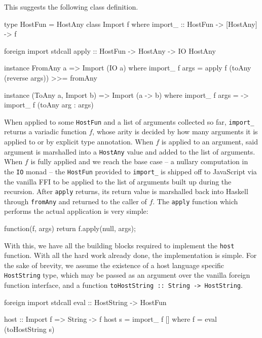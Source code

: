 \documentclass{sigplanconf}
\begin{document}
This suggests the following class definition.

\begin{code}
type HostFun = HostAny
class Import f where
  import_ :: HostFun -> [HostAny] -> f

foreign import stdcall
  apply :: HostFun -> HostAny -> IO HostAny

instance FromAny a => Import (IO a) where
  import_ f args =
    apply f (toAny (reverse args)) >>= fromAny

instance (ToAny a, Import b) =>
         Import (a -> b) where
  import_ f args =
    \arg -> import_ f (toAny arg : args)
\end{code}

When applied to some \lstinline!HostFun! and a list of arguments collected so
far, \lstinline!import_! returns a variadic function $f$, whose arity is decided
by how many arguments it is applied to or by explicit type annotation.
When $f$ is applied to an argument, said argument is marshalled into a
\lstinline!HostAny! value and added to the list of arguments.
When $f$ is fully applied and we reach the base case -- a nullary computation
in the \lstinline!IO! monad -- the \lstinline!HostFun! provided to
\lstinline!import_! is shipped off to JavaScript via the vanilla FFI to be
applied to the list of arguments built up during the recursion.
After \lstinline!apply! returns, its return value is marshalled back into
Haskell through \lstinline!fromAny! and returned to the caller of $f$.
The \lstinline!apply! function which performs the actual application is very
simple:

\begin{code}
function(f, args) {
  return f.apply(null, args);
}
\end{code}

With this, we have all the building blocks required to implement the
\lstinline!host! function. With all the hard work already done, the
implementation is simple. For the sake of brevity, we assume the
existence of a host language specific \lstinline!HostString! type, which may
be passed as an argument over the vanilla foreign function interface, and a
function \lstinline!toHostString :: String -> HostString!.

\begin{code}
foreign import stdcall
  eval :: HostString -> HostFun

host :: Import f => String -> f
host s = import_ f []
  where
    f = eval (toHostString s)
\end{code}
\end{document}
